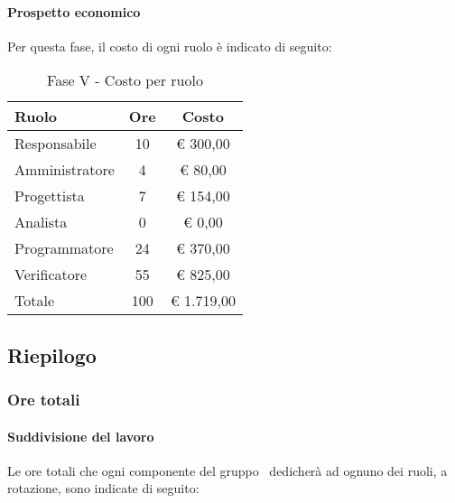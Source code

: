 \documentclass[../PianoProgetto.tex]{subfiles}
\begin{document}
	\paragraph{Prospetto economico}
					Per questa fase, il costo di ogni ruolo è indicato di seguito:
					\begin{table}[h]
		\centering
	
		\begin{tabular}{l * {2}{c}}
			\toprule
			Ruolo & Ore & Costo \\
			\midrule
			Responsabile &	10 & \euro{} 300,00 \\
			\midrule
			Amministratore & 4 & \euro{} 80,00 \\
			\midrule
			Progettista & 7 & \euro{} 154,00 \\
			\midrule
			Analista & 0 & \euro{} 0,00 \\
			\midrule
			Programmatore & 24 & \euro{} 370,00 \\
			\midrule
			Verificatore & 55 & \euro{} 825,00 \\
			\midrule		
			Totale & 100 & \euro{} 1.719,00 \\
			\bottomrule
			
		\end{tabular}
		
		\caption{Fase V - Costo per ruolo}
		\label{tab:faseV_costo}
		
	\end{table}
	
	\subsection{Riepilogo}
			\subsubsection{Ore totali}
				\paragraph{Suddivisione del lavoro}
					Le ore totali che ogni componente del gruppo \leaf\ dedicherà ad ognuno dei ruoli, a rotazione, sono indicate di seguito:
	
\end{document}
